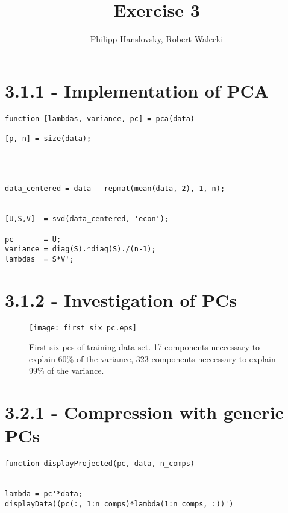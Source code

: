 \documentclass[a4paper,11pt]{article}
\title{Exercise 3}
\author{Philipp Hanslovsky, Robert Walecki}
\theoremstyle{definition}
\theoremstyle{plain}
\theoremstyle{remark}
\begin{document}
\maketitle

\section*{3.1.1 - Implementation of PCA}
\begin{lstlisting}
function [lambdas, variance, pc] = pca(data)

[p, n] = size(data);



 
data_centered = data - repmat(mean(data, 2), 1, n);


[U,S,V]  = svd(data_centered, 'econ');

pc       = U;
variance = diag(S).*diag(S)./(n-1);
lambdas  = S*V';
\end{lstlisting}


\section*{3.1.2 - Investigation of PCs}
\begin{figure}[h!]
\centering
\texttt{[image: first\_six\_pc.eps]}
\caption{First six pcs of training data set. 17 components neccessary to explain 60\% of the variance, 323 components neccessary to explain 99\% of the variance.}
\end{figure}

\clearpage
\section*{3.2.1 - Compression with generic PCs}
\begin{lstlisting}
function displayProjected(pc, data, n_comps)


lambda = pc'*data;
displayData((pc(:, 1:n_comps)*lambda(1:n_comps, :))')
\end{lstlisting}
\end{document}
